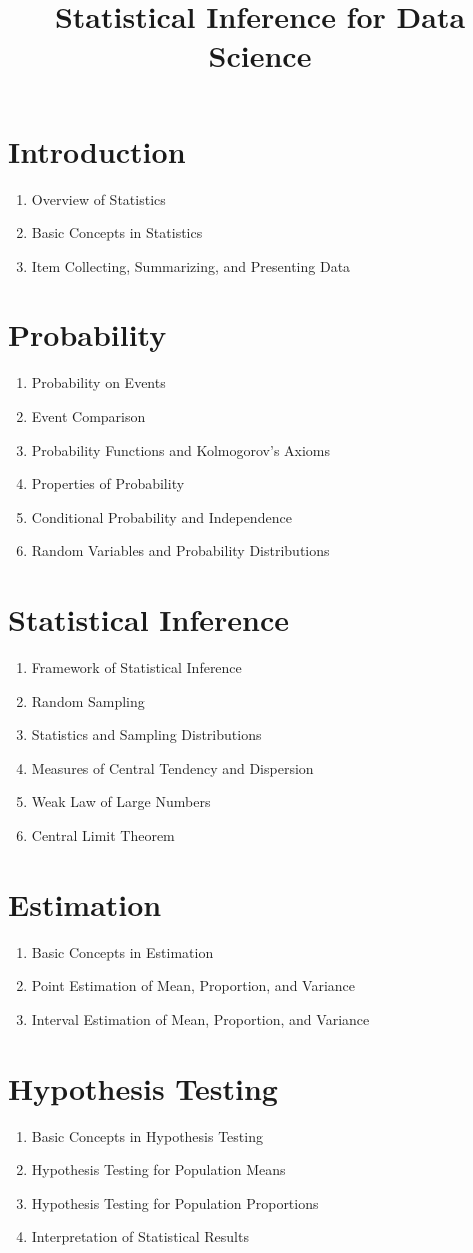 \documentclass{article}
\begin{document}
\title{Statistical Inference for Data Science}

\section{Introduction}
\begin{enumerate}
     \item Overview of Statistics
     \item Basic Concepts in Statistics
     \item Item Collecting, Summarizing, and Presenting Data
\end{enumerate}

\section{Probability}
\begin{enumerate}
    \item Probability on Events
    \item Event Comparison
    \item Probability Functions and Kolmogorov's Axioms
    \item Properties of Probability
    \item Conditional Probability and Independence
    \item Random Variables and Probability Distributions
\end{enumerate}

\section{Statistical Inference}
\begin{enumerate}
    \item Framework of Statistical Inference
    \item Random Sampling
    \item Statistics and Sampling Distributions
    \item Measures of Central Tendency and Dispersion
    \item Weak Law of Large Numbers
    \item Central Limit Theorem
\end{enumerate}

\section{Estimation}
\begin{enumerate}
    \item Basic Concepts in Estimation
    \item Point Estimation of Mean, Proportion, and Variance
    \item Interval Estimation of Mean, Proportion, and Variance
\end{enumerate}

\section{Hypothesis Testing}
\begin{enumerate}
    \item Basic Concepts in Hypothesis Testing
    \item Hypothesis Testing for Population Means
    \item Hypothesis Testing for Population Proportions
    \item Interpretation of Statistical Results
\end{enumerate}
\end{document}
